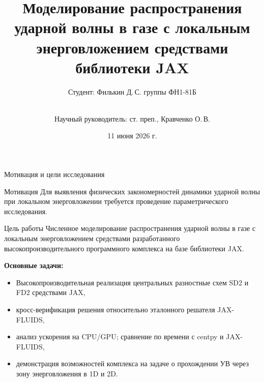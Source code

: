\documentclass[ignoreonframetext,unicode,aspectratio=169]{beamer}
\title[Моделирование УВ с локальным энерговложением на JAX]{Моделирование распространения ударной волны в газе с локальным энерговложением средствами библиотеки JAX}
\author[Филькин Д.\,С.]{Студент: Филькин Д.\,С. группы ФН1-81Б\and\\[0.5mm] Научный руководитель: ст. преп.,  Кравченко О.\,В.}
\institute[каф. Прикладная математика ФН-1]{}
\date{11 июня 2026 г.}
\begin{document}
%	
%	
%	
%	
	
	
	\begin{frame}[plain]
		\maketitle
	\end{frame}

	\begin{frame}{Мотивация и цели исследования}


		\begin{alertblock}{Мотивация}
			Для выявления физических закономерностей динамики ударной волны при локальном энерговложении требуется проведение параметрического исследования.
		\end{alertblock}
%		 
		
		\begin{block}{Цель работы}
			Численное моделирование распространения ударной волны в газе с локальным энерговложением средствами разработанного высокопроизводительного программного комплекса на базе библиотеки JAX.
		\end{block}
		
		
		\textbf{Основные задачи:}
		\begin{itemize}
			\item Высокопроизводительная реализация центральных разностные схем SD2 и FD2 средствами JAX,
			\item кросс-верификация решения относительно эталонного решателя JAX-FLUIDS,
			\item анализ ускорения на CPU/GPU; сравнение по времени с centpy и JAX-FLUIDS,
			\item демонстрация возможностей комплекса на задаче о прохождении УВ через зону энерговложения в 1D и 2D.
		\end{itemize}

	\end{frame}
	
\end{document}
